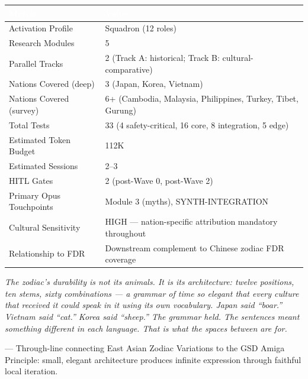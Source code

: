 \documentclass[11pt,letterpaper]{article}
\newcommand{\tableheader}[1]{\textbf{\sffamily\textcolor{white}{#1}}}
\begin{document}
\begin{center}
\begin{tabularx}{\textwidth}{L{4cm}X}
\toprule
{}
\tableheader{Metric} & \tableheader{Value} \\
\midrule
Activation Profile & Squadron (12 roles) \\
Research Modules & 5 \\
Parallel Tracks & 2 (Track A: historical; Track B: cultural-comparative) \\
Nations Covered (deep) & 3 (Japan, Korea, Vietnam) \\
Nations Covered (survey) & 6+ (Cambodia, Malaysia, Philippines, Turkey, Tibet, Gurung) \\
Total Tests & 33 (4 safety-critical, 16 core, 8 integration, 5 edge) \\
Estimated Token Budget & 112K \\
Estimated Sessions & 2--3 \\
HITL Gates & 2 (post-Wave 0, post-Wave 2) \\
Primary Opus Touchpoints & Module 3 (myths), SYNTH-INTEGRATION \\
Cultural Sensitivity & HIGH --- nation-specific attribution mandatory throughout \\
Relationship to FDR & Downstream complement to Chinese zodiac FDR coverage \\
\bottomrule
\end{tabularx}
\end{center}

\vspace{2em}

\begin{quotebox}
\textit{The zodiac's durability is not its animals. It is its architecture: twelve positions, ten stems, sixty combinations --- a grammar of time so elegant that every culture that received it could speak in it using its own vocabulary. Japan said ``boar.'' Vietnam said ``cat.'' Korea said ``sheep.'' The grammar held. The sentences meant something different in each language. That is what the spaces between are for.}

\vspace{0.5em}
\textcolor{subtlegray}{\small --- Through-line connecting East Asian Zodiac Variations to the GSD Amiga Principle: small, elegant architecture produces infinite expression through faithful local iteration.}
\end{quotebox}
\end{document}
